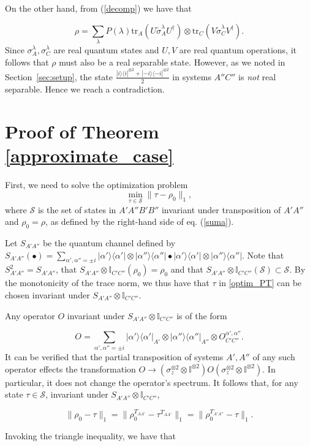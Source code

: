 \documentclass[onecolumn,prx,amsmath,amssymb,12pt]{revtex4-2}
\def\be{\begin{equation}}
\def\ee{\end{equation}}
\def\bra#1{\langle#1|} \def\ket#1{|#1\rangle}
\def\proj#1{\ket{#1}\!\bra{#1}}
\def\id{{\mathbb I}}
\def\tr{\mbox{tr}}
\def\norm#1{\| #1 \| }
\begin{document}
\begin{appendix}
On the other hand, from (\ref{decomp}) we have that

\be
\rho=\sum_\lambda P(\lambda) \tr_A(U\tilde{\sigma}^\lambda_A U^\dagger)\otimes\tr_C(V\tilde{\sigma}^\lambda_C V^\dagger).
\ee
\noindent Since $\sigma_{A}^\lambda,\sigma_{C}^\lambda$ are real quantum states and $U, V$ are real quantum operations, it follows that $\rho$ must also be a real separable state. However, as we noted in Section~\ref{sec:setup}, the state $\frac{\proj{i}^{\otimes 2}+\proj{-i}^{\otimes 2}}{2}$ in systems $A''C''$ is \emph{not} real separable. Hence we reach a contradiction.


\section{Proof of Theorem \ref{approximate_case}} \label{sec:noisy}

First, we need to solve the optimization problem
\be
\min_{\tau \in \mathcal{S}}\norm{\tau-\rho_0}_1,
\label{optim_PT}
\ee
\noindent where $\mathcal{S}$ is the set of states in $A'A''B'B''$ invariant under transposition of $A'A''$ and $\rho_0=\rho$, as defined by the right-hand side of eq. (\ref{suma}).

Let $S_{A'A''}$ be the quantum channel defined by $S_{A'A''}(\bullet)=\sum_{\alpha',\alpha''=\pm i}\proj{\alpha'}\otimes\proj{\alpha''} \bullet \proj{\alpha'}\otimes\proj{\alpha''}$. Note that $S_{A'A''}^2=S_{A'A''}$, that $S_{A'A''}\otimes\id_{C'C''}(\rho_0)=\rho_0$ and that $S_{A'A''}\otimes\id_{C'C''}(\mathcal{S})\subset \mathcal{S}$. By the monotonicity of the trace norm, we thus have that $\tau$ in \eqref{optim_PT} can be chosen invariant under $S_{A'A''}\otimes\id_{C'C''}$. 

Any operator $O$ invariant under $S_{A'A''}\otimes\id_{C'C''}$ is of the form 

\be
O=\sum_{\alpha',\alpha''=\pm i}\proj{\alpha'}_{A'}\otimes\proj{\alpha''}_{A''}\otimes O^{\alpha',\alpha''}_{C'C''}.
\ee
\noindent It can be verified that the partial transposition of systems $A',A''$ of any such operator effects the transformation $O\to(\sigma^{\otimes 2}_z\otimes\id^{\otimes 2}) O(\sigma^{\otimes 2}_z\otimes\id^{\otimes 2})$. In particular, it does not change the operator's spectrum. It follows that, for any state $\tau\in \mathcal{S}$, invariant under $S_{A'A''}\otimes \id_{C'C''}$,

\be
\|\rho_0-\tau\|_1=\|\rho^{T_{AA'}}_0-\tau^{T_{AA'}}\|_1=\|\rho^{T_{A'A''}}_0-\tau\|_1.
\ee

\noindent Invoking the triangle inequality, we have that


\end{appendix}
\end{document}
